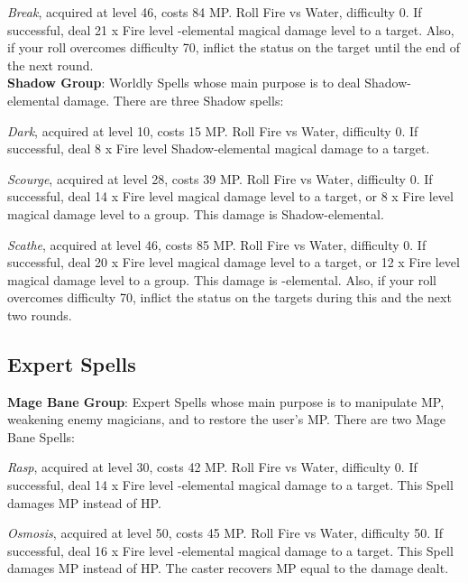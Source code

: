 \begin{multicols}{2}
    \textit{Break}, acquired at level 46, costs 84 MP\@. Roll Fire vs Water, difficulty 0. If successful, deal 21 x Fire level -elemental magical damage level to a target. Also, if your roll overcomes difficulty 70, inflict the  status on the target until the end of the next round.\\%
    
    \textbf{Shadow Group}: Worldly Spells whose main purpose is to deal Shadow-elemental damage. There are three Shadow spells:
    
    \textit{Dark}, acquired at level 10, costs 15 MP\@. Roll Fire vs Water, difficulty 0. If successful, deal 8 x Fire level {Shadow}-elemental magical damage to a target.
    
    \textit{Scourge}, acquired at level 28, costs 39 MP\@. Roll Fire vs Water, difficulty 0. If successful, deal 14 x Fire level magical damage level to a target, or 8 x Fire level magical damage level to a group. This damage is {Shadow}-elemental.
    
    \textit{Scathe}, acquired at level 46, costs 85 MP\@. Roll Fire vs Water, difficulty 0. If successful, deal 20 x Fire level magical damage level to a target, or 12 x Fire level magical damage level to a group. This damage is -elemental. Also, if your roll overcomes difficulty 70, inflict the  status on the targets during this and the next two rounds.
    
    \subsection{Expert Spells}\label{subsec:black-expert}

    \textbf{Mage Bane Group}: Expert Spells whose main purpose is to manipulate MP, weakening enemy magicians, and to restore the user's MP\@. There are two Mage Bane Spells:
    
    \textit{Rasp}, acquired at level 30, costs 42 MP\@. Roll Fire vs Water, difficulty 0. If successful, deal 14 x Fire level -elemental magical damage to a target. This Spell damages MP instead of HP\@. 
    
    \textit{Osmosis}, acquired at level 50, costs 45 MP\@. Roll Fire vs Water, difficulty 50. If successful, deal 16 x Fire level -elemental magical damage to a target. This Spell damages MP instead of HP\@. The caster recovers MP equal to the damage dealt.\\%
    

\end{multicols}
